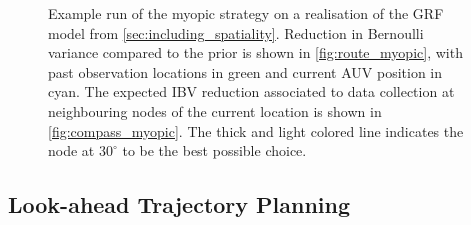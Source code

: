 \documentclass[aoas]{imsart}
\begin{document}
\begin{figure}[ht] 
\centering 
{}
\hspace{2em}
\hspace{2em}
\caption{Example run of the myopic strategy on a realisation of the GRF
model from \ref{sec:including_spatiality}. Reduction in Bernoulli variance
compared to the prior is shown in \ref{fig:route_myopic}, with past observation
locations in green and current AUV position in cyan. The expected IBV reduction
associated to data collection at neighbouring nodes of the current location is
shown in \ref{fig:compass_myopic}. The thick and light colored line indicates the node at $30 ^{\circ}$ to be the best possible choice.}
\label{fig:ebv_myopic}
\end{figure}





\subsection{Look-ahead Trajectory Planning}
\label{sec:LA}
\end{document}
